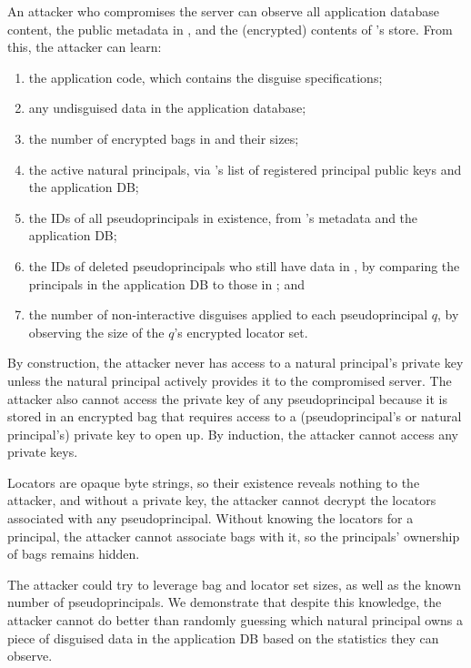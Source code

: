 %
An attacker who compromises the server can observe all application
database content, the public metadata in \sys, and the (encrypted) contents of
\sys's store.
%
From this, the attacker can learn:
\begin{enumerate}[nosep]
  \item the application code, which contains the disguise specifications;
  \item any undisguised data in the application database;
  \item the number of encrypted bags in \sys and their sizes;
  \item the active natural principals, via \sys's list of
    registered principal public keys and the application DB;
  \item the IDs of all pseudoprincipals in existence, from \sys's metadata
    and the application DB;
  \item the IDs of deleted pseudoprincipals who still have data in \sys,
    by comparing the principals in the application DB to those in \sys; and
  \item the number of non-interactive disguises applied to each
    pseudoprincipal $q$, by observing the size of the $q$'s encrypted
    locator set.
\end{enumerate}
%
By construction, the attacker never has access to a natural principal's
private key unless the natural principal actively provides it to the
compromised server.
%
The attacker also cannot access the private key of any pseudoprincipal
because it is stored in an encrypted bag that requires access to a
(pseudoprincipal's or natural principal's) private key to open up.
%
By induction, the attacker cannot access any private keys.
%

%
Locators are opaque byte strings, so their existence reveals nothing to the
attacker, and without a private key, the attacker cannot decrypt the
locators associated with any pseudoprincipal.
%
Without knowing the locators for a principal, the attacker cannot associate
bags with it, so the principals' ownership of bags remains hidden.
%

%
The attacker could try to leverage bag and locator set sizes, as well as the
known number of pseudoprincipals.
%
We demonstrate that despite this knowledge, the attacker cannot do better
than randomly guessing which natural principal owns a piece of disguised
data in the application DB based on the statistics they can observe.
%

